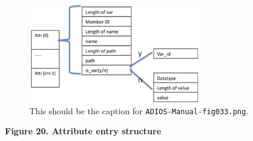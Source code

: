 \begin{figure}[htbp]
\begin{center}
\includegraphics[width=210pt, height=120pt]{ADIOS-Manual-fig033.png}
\caption{This should be the caption for \texttt{ADIOS-Manual-fig033.png}.}
\end{center}
\end{figure}\label{HRef119579105}\label{HToc144350179}

\begin{center}
{\color{color20} \textbf{Figure 20. Attribute entry structure\label{HToc84890278}\label{HToc212016654}\label{HToc212016896}\label{HToc182553425}}}
\end{center}

